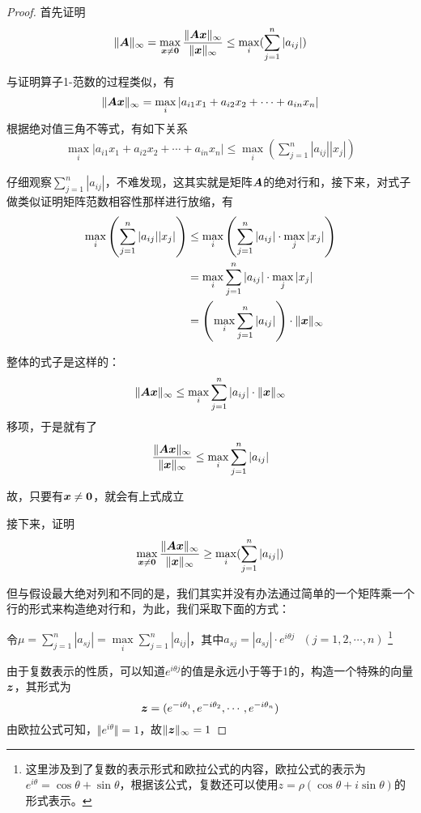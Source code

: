 \documentclass[12pt, a4paper, oneside, UTF8]{ctexbook}
\begin{document}
\begin{proof}
    首先证明\[\Vert\boldsymbol{A}\Vert_{\infty}=\max\limits_{\boldsymbol{x}\neq\boldsymbol{0}}\frac{\Vert\boldsymbol{Ax}\Vert_{\infty}}{\Vert\boldsymbol{x}\Vert_{\infty}}\leq\max\limits_{i}(\sum_{j=1}^{n}|a_{ij}|)\]

    与证明算子1-范数的过程类似，有\[\Vert\boldsymbol{Ax}\Vert_{\infty}=\max\limits_{i}|a_{i1}x_1+a_{i2}x_2+\cdots+a_{in}x_n|\]
    根据绝对值三角不等式，有如下关系\[
    \begin{aligned}
        \max\limits_{i}|a_{i1}x_1+a_{i2}x_2+\cdots+a_{in}x_n|\leq\max\limits_{i}\left(\sum_{j=1}^{n}|a_{ij}||x_j|\right)
    \end{aligned}
    \]

    仔细观察$\sum_{j=1}^{n}|a_{ij}|$，不难发现，这其实就是矩阵$\boldsymbol{A}$的绝对行和，接下来，对式子做类似证明矩阵范数相容性那样进行放缩，有
    \[
    \begin{aligned}
        \max\limits_{i}\left(\sum_{j=1}^{n}|a_{ij}||x_j|\right)&\leq\max\limits_{i}\left(\sum_{j=1}^{n}|a_{ij}|\cdot\max\limits_j|x_j|\right)\\
        &=\max\limits_i\sum_{j=1}^{n}|a_{ij}|\cdot\max_j|x_j|\\
        &=\left(\max\limits_i\sum_{j=1}^{n}|a_{ij}|\right)\cdot\Vert\boldsymbol{x}\Vert_{\infty}
    \end{aligned}
    \]

    整体的式子是这样的：
    \[\Vert\boldsymbol{Ax}\Vert_{\infty}\leq\max\limits_{i}\sum_{j=1}^{n}|a_{ij}|\cdot\Vert\boldsymbol{x}\Vert_{\infty}\]
    移项，于是就有了\[\frac{\Vert\boldsymbol{Ax}\Vert_{\infty}}{\Vert\boldsymbol{x}\Vert_{\infty}}\leq\max\limits_i\sum_{j=1}^{n}|a_{ij}|\]
    
    故，只要有$\boldsymbol{x}\neq\boldsymbol{0}$，就会有上式成立

    接下来，证明\[\max\limits_{\boldsymbol{x}\neq\boldsymbol{0}}\frac{\Vert\boldsymbol{Ax}\Vert_{\infty}}{\Vert\boldsymbol{x}\Vert_{\infty}}\geq\max\limits_{i}(\sum_{j=1}^{n}|a_{ij}|)\]

    但与假设最大绝对列和不同的是，我们其实并没有办法通过简单的一个矩阵乘一个行的形式来构造绝对行和，为此，我们采取下面的方式：

    令$\mu=\sum_{j=1}^{n}|a_{sj}|=\max\limits_i\sum_{j=1}^{n}|a_{ij}|$，其中$a_{sj}=|a_{sj}|\cdot e^{i\theta j}\ \ \ (j=1,2,\cdots,n)$ \footnote[1]{这里涉及到了复数的表示形式和欧拉公式的内容，欧拉公式的表示为$e^{i\theta}=\cos\theta+\sin\theta$，根据该公式，复数还可以使用$z=\rho(\cos\theta+i\sin\theta)$的形式表示。}

由于复数表示的性质，可以知道$e^{i\theta j}$的值是永远小于等于1的，构造一个特殊的向量$\boldsymbol{z}$，其形式为\[\boldsymbol{z}=(e^{-i\theta_1}, e^{-i\theta_2},\cdots,e^{-i\theta_n})\]
由欧拉公式可知，$\Vert e^{i\theta}\Vert=1$，故$\Vert\boldsymbol{z}\Vert_{\infty}=1$


\end{proof}
\end{document}
